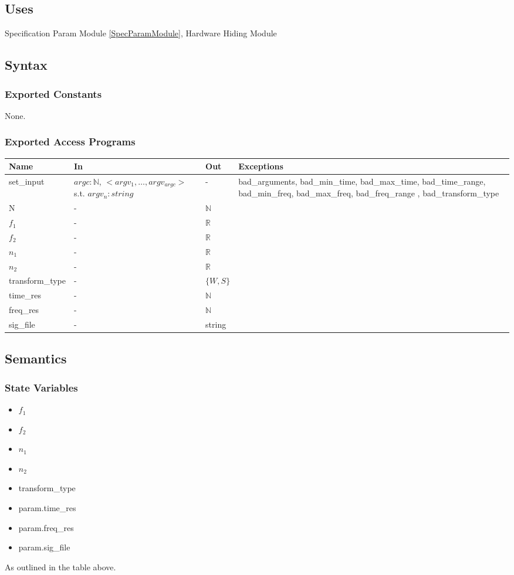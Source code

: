 \documentclass[12pt, titlepage]{article}
\begin{document}
\subsection{Uses}
Specification Param Module \ref{SpecParamModule}, Hardware Hiding Module
\subsection{Syntax}

\subsubsection{Exported Constants}
None.
\subsubsection{Exported Access Programs}

\begin{center}
\begin{tabular}{p{3cm} p{3cm} p{2cm} p{3cm}}
\hline
\textbf{Name} & \textbf{In} & \textbf{Out} & \textbf{Exceptions} \\
\hline
set\_input & $argc: \mathbb{N}$, $<argv_1, \dots, argv_{argc}>$ s.t. $argv_n : string$& - & bad\_arguments, bad\_min\_time, bad\_max\_time, bad\_time\_range, bad\_min\_freq, bad\_max\_freq, bad\_freq\_range , bad\_transform\_type \\
N & - &$\mathbb{N}$ & \\
$f_1$ &  - &$\mathbb{R}$ & \\
$f_2$ & - & $\mathbb{R}$ &  \\
$n_1$ & - & $\mathbb{R}$ & \\
$n_2$ & - & $\mathbb{R}$ & \\
transform\_type & - & $\{W, S\}$ &  \\
time\_res & - & $\mathbb{N} $&\\
freq\_res & - &$\mathbb{N}$ & \\
sig\_file & - & string & \\
\hline
\end{tabular}
\end{center}

\subsection{Semantics}

\subsubsection{State Variables}
\begin{itemize}
\item $f_1$ 
\item $f_2$ 
\item $n_1$ 
\item $n_2$ 
\item transform\_type  
\item param.time\_res
\item param.freq\_res
\item param.sig\_file
\end{itemize}
As outlined in the table above.
\end{document}
